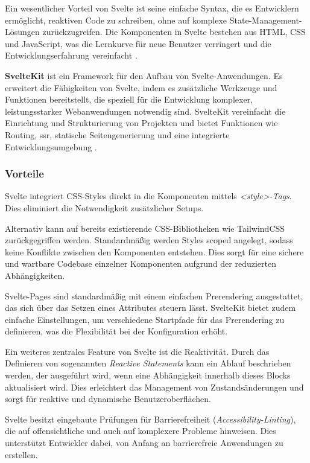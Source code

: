 Ein wesentlicher Vorteil von Svelte ist seine einfache Syntax, die es Entwicklern ermöglicht, reaktiven Code zu schreiben, ohne auf komplexe State-Management-Lösungen zurückzugreifen. Die Komponenten in Svelte bestehen aus HTML, CSS und JavaScript, was die Lernkurve für neue Benutzer verringert und die Entwicklungserfahrung vereinfacht \autocite{Svelte2024}.

\textbf{SvelteKit} ist ein Framework für den Aufbau von Svelte-Anwendungen. Es erweitert die Fähigkeiten von Svelte, indem es zusätzliche Werkzeuge und Funktionen bereitstellt, die speziell für die Entwicklung komplexer, leistungsstarker Webanwendungen notwendig sind. SvelteKit vereinfacht die Einrichtung und Strukturierung von Projekten und bietet Funktionen wie Routing, \ac{ssr}, statische Seitengenerierung und eine integrierte Entwicklungsumgebung \autocite{Svelte2024}.

\subsubsection{Vorteile}

Svelte integriert CSS-Styles direkt in die Komponenten mittels \textit{<style>-Tags}. Dies eliminiert die Notwendigkeit zusätzlicher Setups.

Alternativ kann auf bereits existierende CSS-Bibliotheken wie TailwindCSS zurückgegriffen werden. Standardmäßig werden Styles scoped angelegt, sodass keine Konflikte zwischen den Komponenten entstehen. Dies sorgt für eine sichere und wartbare Codebase einzelner Komponenten aufgrund der reduzierten Abhängigkeiten.

Svelte-Pages sind standardmäßig mit einem einfachen Prerendering ausgestattet, das sich über das Setzen eines Attributes steuern lässt. SvelteKit bietet zudem einfache Einstellungen, um verschiedene Startpfade für das Prerendering zu definieren, was die Flexibilität bei der Konfiguration erhöht.

Ein weiteres zentrales Feature von Svelte ist die Reaktivität. Durch das Definieren von sogenannten \textit{Reactive Statements} kann ein Ablauf beschrieben werden, der ausgeführt wird, wenn eine Abhängigkeit innerhalb dieses Blocks aktualisiert wird. Dies erleichtert das Management von Zustandsänderungen und sorgt für reaktive und dynamische Benutzeroberflächen.

Svelte besitzt eingebaute Prüfungen für Barrierefreiheit (\textit{Accessibility-Linting}), die auf offensichtliche und auch auf komplexere Probleme hinweisen. Dies unterstützt Entwickler dabei, von Anfang an barrierefreie Anwendungen zu erstellen.

